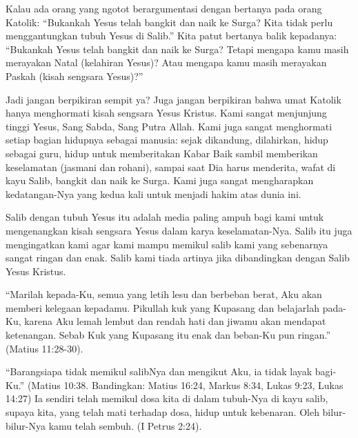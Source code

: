 Kalau ada orang yang ngotot berargumentasi dengan bertanya pada orang Katolik: ``Bukankah Yesus telah bangkit dan naik ke Surga? Kita tidak perlu menggantungkan tubuh Yesus di Salib.''
Kita patut bertanya balik kepadanya: ``Bukankah Yesus telah bangkit dan naik ke Surga? Tetapi mengapa kamu masih merayakan Natal (kelahiran Yesus)? Atau mengapa kamu masih merayakan Paskah (kisah sengsara Yesus)?''

Jadi jangan berpikiran sempit ya? Juga jangan berpikiran bahwa umat Katolik hanya menghormati kisah sengsara Yesus Kristus. Kami sangat menjunjung tinggi Yesus, Sang Sabda, Sang Putra Allah. Kami juga sangat menghormati setiap bagian hidupnya sebagai manusia: sejak dikandung, dilahirkan, hidup sebagai guru, hidup untuk memberitakan Kabar Baik sambil memberikan keselamatan (jasmani dan rohani), sampai saat Dia harus menderita, wafat di kayu Salib, bangkit dan naik ke Surga. Kami juga sangat mengharapkan kedatangan-Nya yang kedua kali untuk menjadi hakim atas dunia ini.

Salib dengan tubuh Yesus itu adalah media paling ampuh bagi kami untuk mengenangkan kisah sengsara Yesus dalam karya keselamatan-Nya. Salib itu juga mengingatkan kami agar kami mampu memikul salib kami yang sebenarnya sangat ringan dan enak. Salib kami tiada artinya jika dibandingkan dengan Salib Yesus Kristus.

``Marilah kepada-Ku, semua yang letih lesu dan berbeban berat, Aku akan memberi kelegaan kepadamu. Pikullah kuk yang Kupasang dan belajarlah pada-Ku, karena Aku lemah lembut dan rendah hati dan jiwamu akan mendapat ketenangan. Sebab Kuk yang Kupasang itu enak dan beban-Ku pun ringan.'' (Matius 11:28-30).

``Barangsiapa tidak memikul salibNya dan mengikut Aku, ia tidak layak bagi-Ku.'' (Matius 10:38. Bandingkan: Matius 16:24, Markus 8:34, Lukas 9:23, Lukas 14:27)
Ia sendiri telah memikul dosa kita di dalam tubuh-Nya di kayu salib, supaya kita, yang telah mati terhadap dosa, hidup untuk kebenaran. Oleh bilur-bilur-Nya kamu telah sembuh. (I Petrus 2:24).

